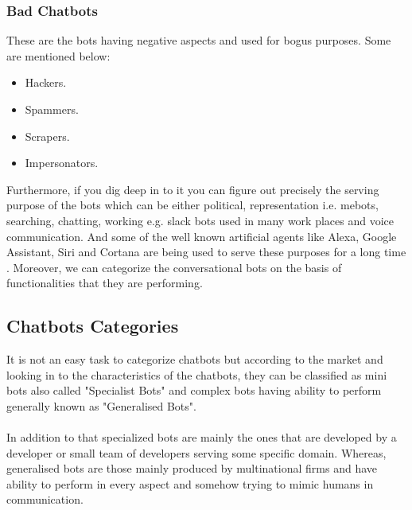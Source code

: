 \subsubsection*{Bad Chatbots}
These are the bots having negative aspects and used for bogus purposes. Some are mentioned below\cite{botnerds}:
\begin{itemize}
\item Hackers.
\item Spammers.
\item Scrapers.
\item Impersonators. 
\end{itemize}
Furthermore, if you dig deep in to it you can figure out precisely the serving purpose of the bots which can be either political, representation i.e. mebots, searching, chatting, working e.g. slack bots used in many work places and voice communication. And some of the well known artificial agents like Alexa, Google Assistant, Siri and Cortana are being used to serve these purposes for a long time \cite{listeningtobots}. Moreover, we can categorize the conversational bots on the basis of functionalities that they are performing.

\subsection{Chatbots Categories}
It is not an easy task to categorize chatbots but according to the market and looking in to the characteristics of the chatbots, they can be classified as mini bots also called "Specialist Bots" and complex bots having ability to perform generally known as "Generalised Bots". \cite{botnerds}
\\~\\
In addition to that specialized bots are mainly the ones that are developed by a developer or small team of developers serving some specific domain. Whereas, generalised bots are those mainly produced by multinational firms and have ability to perform in every aspect and somehow trying to mimic humans in communication.

